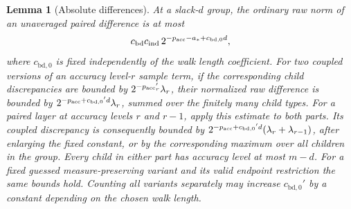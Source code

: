 \documentclass[11pt]{article}
\numberwithin{equation}{section}
\newtheorem{lemma}[theorem]{Lemma}
\theoremstyle{definition}
\theoremstyle{remark}
\begin{document}
\begin{lemma}[Absolute differences]\label{lem:est-raw-difference}
At a slack-$d$ group, the ordinary raw norm of an unaveraged paired
difference is at most
\begin{equation}
 {c_{\rm bd}} {c_{\rm ind}}\,2^{-{p_{\rm acc}}-{a}_*+{c_{\mathrm{bd},0}}d},
 \label{eq:est-raw-bound}
\end{equation}
where ${c_{\mathrm{bd},0}}$ is fixed independently of the walk length coefficient.
For two coupled versions of an accuracy level-$r$ sample term, if the
corresponding child discrepancies are bounded by
$2^{-{p_{\rm acc}}'_r}\lambda_r$, their normalized raw difference is bounded by
$2^{-{p_{\rm acc}}+{c_{\mathrm{bd},0}}'d}\lambda_r$, summed over the finitely many child types.
For a paired layer at accuracy levels ${r}$ and ${r}-1$, apply this estimate to
both parts. Its coupled discrepancy is consequently bounded by
$2^{-{p_{\rm acc}}+{c_{\mathrm{bd},0}}'d}(\lambda_{r}+\lambda_{{r}-1})$, after enlarging the fixed
constant, or by the corresponding maximum over all children in the
group. Every child in either part has accuracy level at most ${m}-d$.
For a fixed guessed measure-preserving variant and its valid endpoint
restriction the same bounds hold.  Counting all variants separately may
increase ${c_{\mathrm{bd},0}}'$ by a constant depending on the chosen walk length.
\end{lemma}
\end{document}
